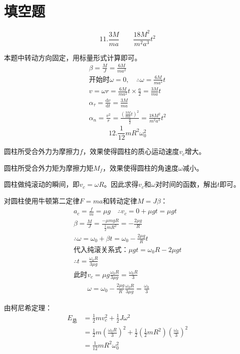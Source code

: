 \documentclass[b5paper,opensource]{./template/qyxf-book}
\newcommand{\di}[1]{\mathrm{d}#1}
\newcommand{\dy}[2]{\frac{\di{#1}}{\di{#2}}}
\begin{document}
\section{填空题}
		\[11.\frac{3M}{ma} \hspace{2em} \frac{18M^2}{m^2a^3}t^2\]\par
		本题中转动方向固定，用标量形式计算即可。
		\begin{gather*}
		\beta=\frac{M}{J}=\frac{6M}{ma^2}\\
		\text{开始时}\omega=0,\quad\therefore \omega=\frac{6M}{ma^2}t\\
		v=\omega r=\frac{6M}{ma^2}t\times\frac{a}{2}=\frac{3M}{ma}t\\
		\alpha_{\tau}=\dy{v}{t}=\frac{3M}{ma}\\
		\alpha_n=\frac{v^2}{r}=\frac{\left(\frac{3M}{ma}t\right)^2}{\frac{a}{2}}=\frac{18M^2}{m^2a^3}t^2
		\end{gather*}
		\[12.\frac{1}{12}mR^2\omega_0^2\]\par
		圆柱所受合外力为摩擦力$f$，效果使得圆柱的质心运动速度$ v_c $增大。\par
		圆柱所受合外力矩为摩擦力矩$ M_f $，效果使得圆柱的角速度$ \omega $减小。\par
		圆柱做纯滚动的瞬间，即$ v_c=\omega R $。因此求得$ v_c $和$ \omega $对时间的函数，解出$ t $即可。\par
		对圆柱使用牛顿第二定律$F=ma$和转动定律$M=J\beta$：
		\begin{gather*}
		a_c=\frac{f}{m}=\mu g\quad\therefore v_c=0+\mu gt=\mu gt\\
		\beta=\frac{M}{J}=\frac{-\mu mgR}{\frac{1}{2}mR^2}=-\frac{2\mu g}{R}\\
		\therefore \omega=\omega_0+\beta t=\omega_0-\frac{2\mu g}{R}t\\
		\text{代入纯滚关系式：}\mu gt=\omega_0R-2\mu gt\\
		\therefore t=\frac{\omega_0R}{3\mu g}\\
		\text{此时}v_c=\mu g\frac{\omega_0R}{3\mu g}=\frac{\omega_0R}{3}\\
		\hspace{2em}\omega=\omega_0-\frac{2\mu g}{R}\frac{\omega_0R}{3\mu g}=\frac{\omega_0}{3}
		\end{gather*}\par
		由柯尼希定理：
		\begin{align*}
		E_{\text{总}}&=\frac{1}{2}mv_c^2+\frac{1}{2}J\omega^2\\
		&=\frac{1}{2}m\left(\frac{\omega_0R}{3}\right)^2+\frac{1}{2}\left(\frac{1}{2}mR^2\right)\left(\frac{\omega_0}{3}\right)^2\\
		&=\frac{1}{12}mR^2\omega_0^2
		\end{align*}
\end{document}
